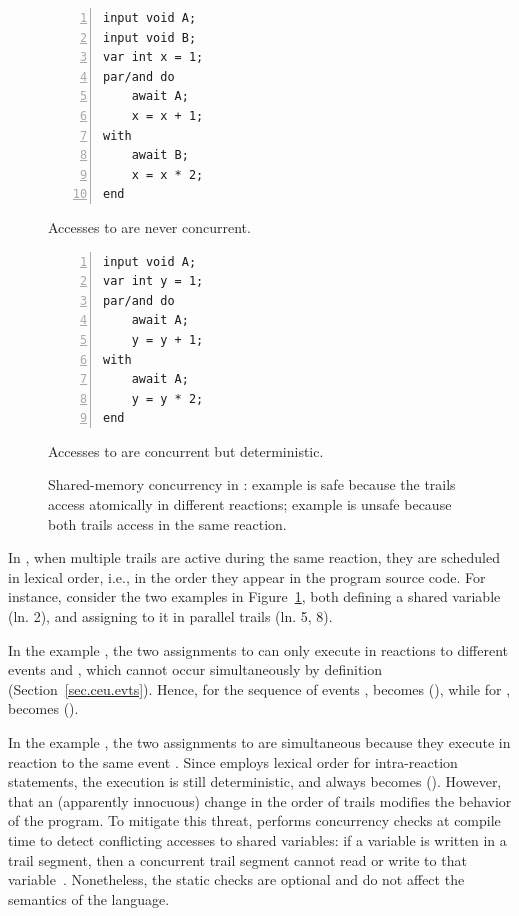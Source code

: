 \begin{figure}[h]
\begin{minipage}[h]{0.45\linewidth}
\begin{lstlisting}[numbers=left,xleftmargin=3em]
input void A;
input void B;
var int x = 1;
par/and do
    await A;
    x = x + 1;
with
    await B;
    x = x * 2;
end
\end{lstlisting}
\centering\small{\ax Accesses to  are never concurrent.}
\end{minipage}
%
\begin{minipage}[h]{0.45\linewidth}
\begin{lstlisting}[numbers=left,xleftmargin=3em]
input void A;
var int y = 1;
par/and do
    await A;
    y = y + 1;
with
    await A;
    y = y * 2;
end
\end{lstlisting}
\centering\small{\bx Accesses to  are concurrent but deterministic.}
\end{minipage}
\caption{ Shared-memory concurrency in \CEU:
example \ax is safe because the trails access  atomically in different
reactions;
example \bx is unsafe because both trails access  in the same reaction.
\label{lst.shared}
}
\end{figure}

In \CEU, when multiple trails are active during the same reaction, they are
scheduled in lexical order, i.e., in the order they appear in the program
source code.
%
For instance, consider the two examples in Figure~\ref{lst.shared}, both
defining a shared variable (ln. 2), and assigning to it in parallel trails (ln.
5, 8).

In the example \ax, the two assignments to  can only execute in
reactions to different events  and , which cannot occur
simultaneously by definition (Section~\ref{sec.ceu.evts}).
Hence, for the sequence of events ,  becomes 
(), while for ,  becomes 
().

In the example \bx, the two assignments to  are simultaneous because
they execute in reaction to the same event .
Since \CEU employs lexical order for intra-reaction statements, the execution
is still deterministic, and  always becomes  ().
%
However, that an (apparently innocuous) change in the order of trails modifies
the behavior of the program.
%
To mitigate this threat, \CEU performs concurrency checks at compile time to
detect conflicting accesses to shared variables:
if a variable is written in a trail segment, then a concurrent trail segment
cannot read or write to that variable~\cite{ceu.sensys13}.
%
Nonetheless, the static checks are optional and do not affect the semantics of
the language.

